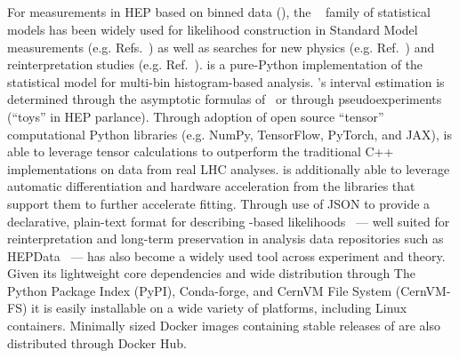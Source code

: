\subsection{\pyhf{}}\label{subsec:pyhf}

For measurements in HEP based on binned data (), the \HiFa{}~\cite{Cranmer:1456844} family of statistical models has been widely used for likelihood construction in Standard Model measurements (e.g. Refs.~\cite{HIGG-2013-02,Aaij:2015sqa}) as well as searches for new physics (e.g. Ref.~\cite{SUSY-2016-10}) and reinterpretation studies (e.g. Ref.~\cite{Alguero:2020grj}).
\pyhf{} is a pure-Python implementation of the \HiFa{} statistical model for multi-bin histogram-based analysis.
\pyhf{}'s interval estimation is determined through the asymptotic formulas of~\cite{Cowan:2010js} or through pseudoexperiments (``toys'' in HEP parlance).
Through adoption of open source ``tensor'' computational Python libraries (e.g. NumPy, TensorFlow, PyTorch, and JAX), \pyhf{} is able to leverage tensor calculations to outperform the traditional C++ implementations on data from real LHC analyses.
\pyhf{} is additionally able to leverage automatic differentiation and hardware acceleration from the libraries that support them to further accelerate fitting.
Through use of JSON to provide a declarative, plain-text format for describing \HiFa{}-based likelihoods~\cite{ATL-PHYS-PUB-2019-029} --- well suited for reinterpretation and long-term preservation in analysis data repositories such as HEPData~\cite{Maguire:2017ypu} --- \pyhf{} has also become a widely used tool across experiment and theory.
Given its lightweight core dependencies and wide distribution through The Python Package Index (PyPI), Conda-forge, and CernVM File System (CernVM-FS) it is easily installable on a wide variety of platforms, including Linux containers.
Minimally sized Docker images containing stable releases of \pyhf{} are also distributed through Docker Hub.
